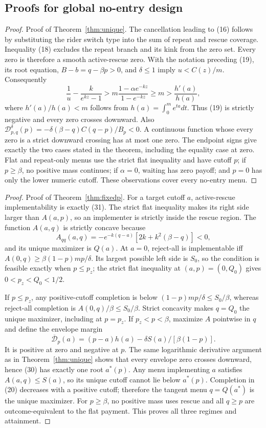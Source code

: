 \documentclass[mnsc,dblanonrev]{informs4}
\begin{document}
\begin{APPENDICES}
\section{Proofs for global no-entry design}
\label{app:global}

\begin{proof}{Proof of Theorem~\ref{thm:unique}.}
The cancellation leading to (16) follows by substituting the rider switch
type into the sum of repeat and rescue coverage.  Inequality (18) excludes
the repeat branch and its kink from the zero set.  Every zero is therefore a
smooth active-rescue zero.  With the notation preceding (19), its root
equation, $B-b=q-\beta p>0$, and $\delta\le1$ imply
$u<C(z)/m$.  Consequently
\[
 \frac1u-\frac{k}{e^{kz}-1}
 >m\frac{1-\alpha e^{-kz}}{1-e^{-kz}}
 \ge m>\frac{h'(a)}{h(a)},
\]
where $h'(a)/h(a)<m$ follows from
$h(a)=\int_0^m e^{ta}dt$.  Thus (19) is strictly negative and every zero
crosses downward.  Also
$\mathcal D_{p,q}^{\delta}(p)
=-\delta(\beta-q)C(q-p)/B_p<0$.
A continuous function whose every zero is a strict downward crossing has at
most one zero.  The endpoint signs give exactly the two cases stated in the
theorem, including the equality case at zero.  Flat and repeat-only menus use
the strict flat inequality and have cutoff $p$; if $p\ge\beta$, no positive
mass continues; if $\alpha=0$, waiting has zero payoff; and $p=0$ has only
the lower numeric cutoff.  These observations cover every no-entry menu.
\Halmos\end{proof}

\begin{proof}{Proof of Theorem~\ref{thm:fixedp}.}
For a target cutoff $a$, active-rescue implementability is exactly (31).
The strict flat inequality makes its right side larger than $A(a,p)$, so an
implementer is strictly inside the rescue region.  The function $A(a,q)$ is
strictly concave because
\[
 A_{qq}(a,q)=-e^{-k(q-a)}[2k+k^2(\beta-q)]<0,
\]
and its unique maximizer is $Q(a)$.  At $a=0$, reject-all is implementable
iff $A(0,q)\ge\beta(1-p)mp/\delta$.  Its largest possible left side is $S_0$,
so the condition is feasible exactly when $p\le p_z$; the strict flat
inequality at $(a,p)=(0,Q_0)$ gives $0<p_z<Q_0<1/2$.

If $p\le p_z$, any positive-cutoff completion is below $(1-p)mp/\delta\le
S_0/\beta$, whereas reject-all completion is $A(0,q)/\beta\le S_0/\beta$.
Strict concavity makes $q=Q_0$ the unique maximizer, including at $p=p_z$.
If $p_z<p<\beta$, maximize $A$ pointwise in $q$ and define the envelope
margin
\[
 \overline{\mathcal D}_p(a)
 =(p-a)h(a)-\delta S(a)/[\beta(1-p)].
\]
It is positive at zero and negative at $p$.  The same logarithmic derivative
argument as in Theorem~\ref{thm:unique} shows that every envelope zero crosses
downward, hence (30) has exactly one root $a^*(p)$.  Any menu implementing
$a$ satisfies $A(a,q)\le S(a)$, so its unique cutoff cannot lie below
$a^*(p)$.  Completion in (20) decreases with a positive cutoff; therefore
the tangent menu $q=Q(a^*)$ is the unique maximizer.  For $p\ge\beta$, no
positive mass uses rescue and all $q\ge p$ are outcome-equivalent to the flat
payment.  This proves all three regimes and attainment.
\Halmos\end{proof}


\end{APPENDICES}
\end{document}
